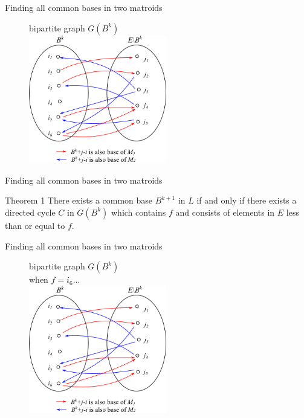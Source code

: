 \documentclass[11pt,xcolor=dvipsnames,table,dvipdfmx]{beamer}
\begin{document}
\begin{frame}{Finding all common bases in two matroids}
 \begin{figure}
  bipartite graph $G(B^k)$\vspace{1cm}\\
  \centering
  \includegraphics[width=6cm]{text8631-16-2-7.png}
 \end{figure}
\end{frame}

\begin{frame}{Finding all common bases in two matroids}
 \begin{block}{Theorem 1}
  There exists a common base $B^{k+1}$ in $L$ if and only if there exists a directed cycle $C$ in $G(B^k)$ which contains $f$ and consists of elements in $E$ less than or equal to $f$.
 \end{block}
\end{frame}

\begin{frame}{Finding all common bases in two matroids}
 \begin{figure}
  bipartite graph $G(B^k)$\\
  when $f = i_6$...\vspace{0.52cm}\\
  \centering
  \includegraphics[width=6cm]{text8631-16-2-7.png}
 \end{figure}
\end{frame}
\end{document}
